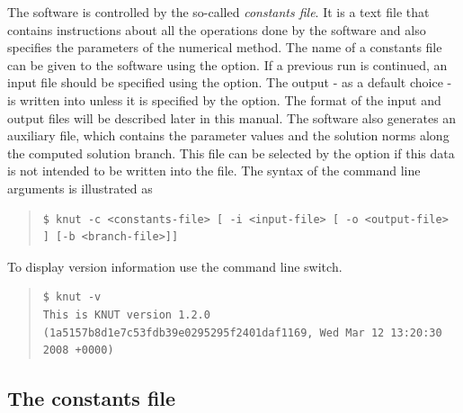 \documentclass[10pt,a4paper]{ddedoc}
\begin{document}
The software is controlled by the so-called \emph{constants file}. It is a text file
that contains instructions about all the operations done by the software and
also specifies the parameters of the numerical method.
The name of a constants file can be given to the software using the  option.
If a previous run is continued, an input file should be specified using the  option. 
The output - as a default choice - is written into  unless it is specified
by the  option. The format of the input and output files will
be described later in this manual. The software also generates an auxiliary file,
which contains the parameter values and the solution norms along the computed
solution branch.
This file can be selected by the  option if this data is not intended
to be written into the  file. The syntax of the command line
arguments is illustrated as
{ \small \begin{quote} \begin{lstlisting}[basicstyle=\tt,frame=single]
$ knut -c <constants-file> [ -i <input-file> [ -o <output-file> ] [-b <branch-file>]]
\end{lstlisting} \end{quote} } \noindent
To display version information use the  command line switch.
{ \small \begin{quote} \begin{lstlisting}[basicstyle=\tt,frame=single]
$ knut -v
This is KNUT version 1.2.0 (1a5157b8d1e7c53fdb39e0295295f2401daf1169, Wed Mar 12 13:20:30 2008 +0000)
\end{lstlisting} \end{quote} } \noindent


\subsection{The constants file}
\label{constfile}
\end{document}

